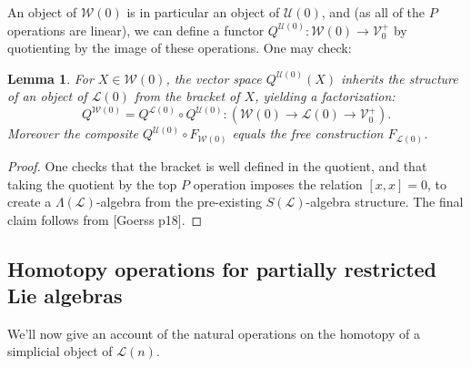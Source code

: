 \documentclass[11pt]{amsart}
\theoremstyle{plain}
\newtheorem{lem}[thm]{Lemma}
\theoremstyle{definition}
\renewcommand{\to}{\longrightarrow}
\newcommand{\scrL}{\mathscr{L}}
\newcommand{\calW}{\mathcal{W}}
\newcommand{\calU}{\mathcal{U}}
\newcommand{\calL}{\mathcal{L}}
\newcommand{\calV}{\mathcal{V}}
\theoremstyle{plain}
\newcommand{\LieOperad}{{\scrL}}
\newcommand{\vect}[2]{\calV^{#1}_{#2}}
\begin{document}
\begin{Lie algebras in characteristic 2 and their homotopy operations}
An object of $\calW(0)$ is in particular an object of $\calU(0)$, and (as all of the $P$ operations are linear), we can define a functor $Q^{\calU(0)}:\calW(0)\to\vect{+}{0}$ by quotienting by the image of these operations. One may check:
\begin{lem}\label{Kill P ops gives lie alg}
For $X\in\calW(0)$, the vector space $Q^{\calU(0)}(X)$ inherits the structure of an object of $\calL(0)$ from the bracket of $X$, yielding a factorization:%
\[Q^{\calW(0)}=Q^{\calL(0)}\circ Q^{\calU(0)}:\left(\calW(0)\to \calL(0)\to \vect{+}{0}\right).\]
Moreover the composite $Q^{\calU(0)}\circ F_{\calW(0)}$ equals the free construction $F_{\calL(0)}$.
\end{lem}
\begin{proof}
One checks that the bracket is well defined in the quotient, and that taking the quotient by the top $P$ operation imposes the relation $[x,x]=0$, to create a $\Lambda(\LieOperad)$-algebra from the pre-existing $S(\LieOperad)$-algebra structure. The final claim follows from [Goerss p18].
\end{proof}


\subsection{Homotopy operations for partially restricted Lie algebras}
We'll now give an account of the natural operations on the homotopy of a simplicial object of $\calL(n)$.


\end{Lie algebras in characteristic 2 and their homotopy operations}
\end{document}
